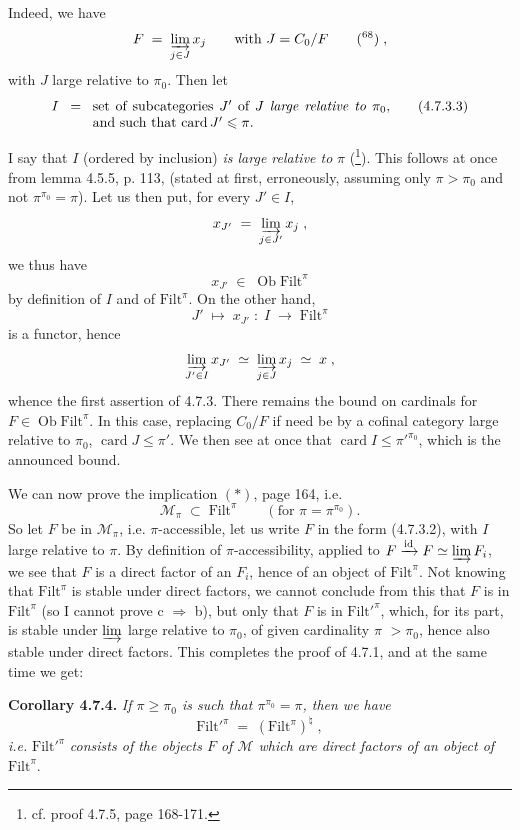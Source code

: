 \documentclass[11pt]{article}
\newcommand{\printedpage}[1]{\marginpar{\footnotesize p.~#1}}
\newcommand{\msp}[1]{\marginpar{\footnotesize [#1]}}
\newcommand{\Filt}{\mathrm{Filt}}
\newcommand{\card}{\operatorname{card}}
\newcommand{\Ob}{\operatorname{Ob}}
\begin{document}
Indeed, we have
\[
F \;=\; \varinjlim_{j \in J} x_j \qquad \text{with } J = C_0/F \qquad \text{(\footnotemark[68])}\;,
\]
with $J$ large relative to $\pi_0$. Then let
\[
I \;\;=\;\; \parbox[t]{0.62\textwidth}{set of subcategories $J'$ of $J$ \textit{large relative to} $\pi_0$, and such that $\card J' \leqslant \pi$.} \tag*{(4.7.3.3)}
\]

\printedpage{55}

I say that $I$ (ordered by inclusion) \textit{is large relative to} $\pi$ (\footnote[69]{cf. proof 4.7.5, page 168-171.}). This follows at once from lemma 4.5.5, p. 113, (stated at first, erroneously, assuming only $\pi > \pi_0$ and not $\pi^{\pi_0} = \pi$). Let us then put, for every $J' \in I$,
\[
x_{J'} \;=\; \varinjlim_{j \in J'} x_j \;,
\]
we thus have
\[
x_{J'} \;\in\; \Ob \Filt^{\pi}
\]
by definition of $I$ and of $\Filt^{\pi}$. On the other hand,
\[
J' \;\longmapsto\; x_{J'} \;:\; I \;\longrightarrow\; \Filt^{\pi}
\]
\msp{page 166}
is a functor, hence
\[
\varinjlim_{J' \in I} x_{J'} \;\simeq\; \varinjlim_{j \in J} x_j \;\simeq\; x \;, %
\]
whence the first assertion of 4.7.3. There remains the bound on cardinals for $F \in \Ob \Filt^{\pi}$. In this case, replacing $C_0/F$ if need be by a cofinal category large relative to $\pi_0$, $\card J \leqslant \pi'$. We then see at once that $\card I \leqslant \pi'^{\pi_0}$, which is the announced bound.

We can now prove the implication $(*)$, page 164, i.e.
\[
\mathcal{M}_{\pi} \;\subset\; \Filt^{\pi} \qquad (\text{for } \pi = \pi^{\pi_0}).
\]
So let $F$ be in $\mathcal{M}_{\pi}$, i.e. $\pi$-accessible, let us write $F$ in the form (4.7.3.2), with $I$ large relative to $\pi$. By definition of $\pi$-accessibility, applied to $F \xrightarrow{\mathrm{id}} F \simeq \varinjlim F_i$, we see that $F$ is a direct factor of an $F_i$, hence of an object of $\Filt^{\pi}$. Not knowing that $\Filt^{\pi}$ is stable under direct factors, we cannot conclude from this that $F$ is in $\Filt^{\pi}$ (so I cannot prove c $\Longrightarrow$ b), but only that $F$ is in $\Filt'^{\pi}$, which, for its part, is stable under $\varinjlim$ large relative to $\pi_0$, of given cardinality $\pi$ $> \pi_0$, hence also \msp{page 167} stable under direct factors. This completes the proof of 4.7.1, and at the same time we get:

\textbf{Corollary 4.7.4.} \textit{If $\pi \geqslant \pi_0$ is such that $\pi^{\pi_0} = \pi$, then we have}
\[
\Filt'^{\pi} \;=\; (\Filt^{\pi})^{\natural} \;, \tag*{(4.7.4.1)}
\]
\textit{i.e.} $\Filt'^{\pi}$ \textit{consists of the objects $F$ of $\mathcal{M}$ which are direct factors of an object of} $\Filt^{\pi}$.
\end{document}
